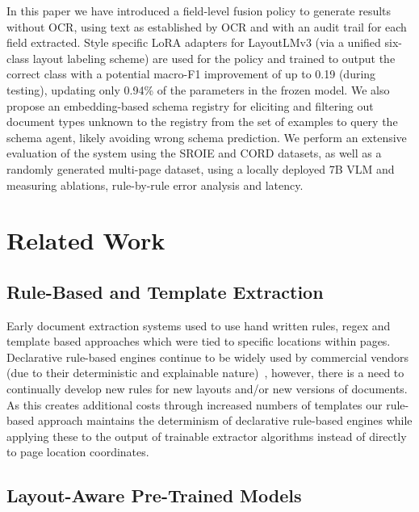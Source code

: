 \documentclass[conference]{IEEEtran}
\begin{document}
In this paper we have introduced a field-level fusion policy to generate results without OCR, using text as established by OCR and with an audit trail for each field extracted. Style specific LoRA adapters for LayoutLMv3 (via a unified six-class layout labeling scheme) are used for the policy and trained to output the correct class with a potential macro-F1 improvement of up to 0.19 (during testing), updating only 0.94\% of the parameters in the frozen model. We also propose an embedding-based schema registry for eliciting and filtering out document types unknown to the registry from the set of examples to query the schema agent, likely avoiding wrong schema prediction. We perform an extensive evaluation of the system using the SROIE and CORD datasets, as well as a randomly generated multi-page dataset, using a locally deployed 7B VLM and measuring ablations, rule-by-rule error analysis and latency.

\section{Related Work}
\label{sec:related}

\subsection{Rule-Based and Template Extraction}

Early document extraction systems used to use hand written rules, regex and template based approaches which were tied to specific locations within pages. Declarative rule-based engines continue to be widely used by commercial vendors (due to their deterministic and explainable nature)~\cite{chiticariu2013rule}, however, there is a need to continually develop new rules for new layouts and/or new versions of documents. As this creates additional costs through increased numbers of templates our rule-based approach maintains the determinism of declarative rule-based engines while applying these to the output of trainable extractor algorithms instead of directly to page location coordinates.
\subsection{Layout-Aware Pre-Trained Models}
\end{document}
